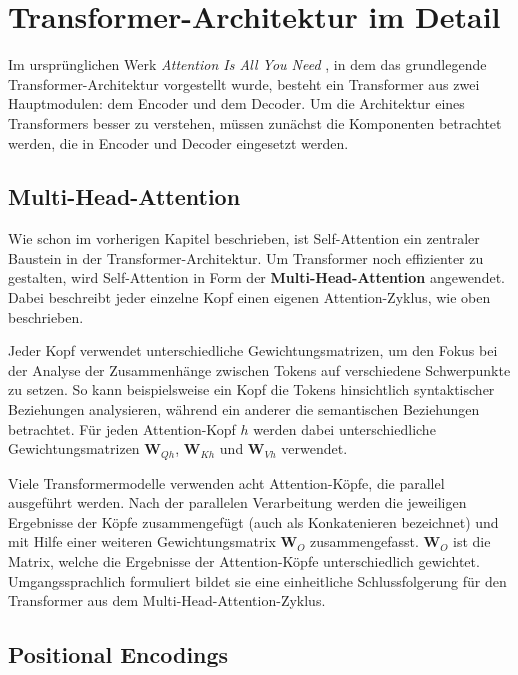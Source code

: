 \chapter{Transformer-Architektur im Detail}

Im ursprünglichen Werk \textit{Attention Is All You Need} , in dem das grundlegende Transformer-Architektur vorgestellt wurde, besteht ein Transformer aus zwei Hauptmodulen: dem Encoder und dem Decoder.
Um die Architektur eines Transformers besser zu verstehen, müssen zunächst die Komponenten betrachtet werden, die in Encoder und Decoder eingesetzt werden.

\section{Multi-Head-Attention}

Wie schon im vorherigen Kapitel beschrieben, ist Self-Attention ein zentraler Baustein in der Transformer-Architektur.  
Um Transformer noch effizienter zu gestalten, wird Self-Attention in Form der \textbf{Multi-Head-Attention} angewendet. Dabei beschreibt jeder einzelne Kopf einen eigenen Attention-Zyklus, wie oben beschrieben.

Jeder Kopf verwendet unterschiedliche Gewichtungsmatrizen, um den Fokus bei der Analyse der Zusammenhänge zwischen Tokens auf verschiedene Schwerpunkte zu setzen.  
So kann beispielsweise ein Kopf die Tokens hinsichtlich syntaktischer Beziehungen analysieren, während ein anderer die semantischen Beziehungen betrachtet.  
Für jeden Attention-Kopf \( h \) werden dabei unterschiedliche Gewichtungsmatrizen \( \mathbf{W}_{Qh} \), \( \mathbf{W}_{Kh} \) und \( \mathbf{W}_{Vh} \) verwendet.

Viele Transformermodelle verwenden acht Attention-Köpfe, die parallel ausgeführt werden.  
Nach der parallelen Verarbeitung werden die jeweiligen Ergebnisse der Köpfe zusammengefügt (auch als Konkatenieren bezeichnet) und mit Hilfe einer weiteren Gewichtungsmatrix \( \mathbf{W}_{O} \) zusammengefasst.  
\( \mathbf{W}_{O} \) ist die Matrix, welche die Ergebnisse der Attention-Köpfe unterschiedlich gewichtet.  
Umgangssprachlich formuliert bildet sie eine einheitliche Schlussfolgerung für den Transformer aus dem Multi-Head-Attention-Zyklus.

\section{Positional Encodings}

